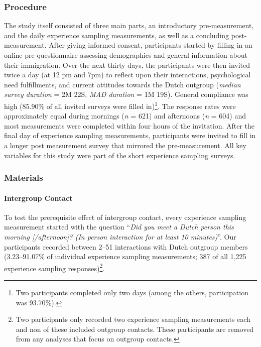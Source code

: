 \subsubsection{Procedure}

The study itself consisted of three main parts, an introductory
pre-measurement, and the daily experience sampling measurements, as well
as a concluding post-measurement. After giving informed consent,
participants started by filling in an online pre-questionnaire assessing
demographics and general information about their immigration. Over the
next thirty days, the participants were then invited twice a day (at 12
pm and 7pm) to reflect upon their interactions, psychological need
fulfillments, and current attitudes towards the Dutch outgroup
(\textit{median survey duration} = 2M 22S, \textit{MAD duration} = 1M
19S). General compliance was high (85.90\% of all invited surveys were
filled
in)\footnote{Two participants completed only two days (among the others, participation was 93.70\%).}.
The response rates were approximately equal during mornings (\textit{n}
= 621) and afternoons (\textit{n} = 604) and most measurements were
completed within four hours of the invitation. After the final day of
experience sampling measurements, participants were invited to fill in a
longer post measurement survey that mirrored the pre-measurement. All
key variables for this study were part of the short experience sampling
surveys.

\subsubsection{Materials}

\paragraph{Intergroup Contact}

To test the prerequisite effect of intergroup contact, every experience
sampling measurement started with the question
``\textit{Did you meet a Dutch person this morning [/afternoon]? (In person interaction for at least 10 minutes)}''.
Our participants recorded between 2--51 interactions with Dutch outgroup
members (3.23--91.07\% of individual experience sampling measurements;
387 of all 1,225 experience sampling
responses)\footnote{Two participants only recorded two experience sampling measurements each and non of these included outgroup contacts. These participants are removed from any analyses that focus on outgroup contacts.}.


